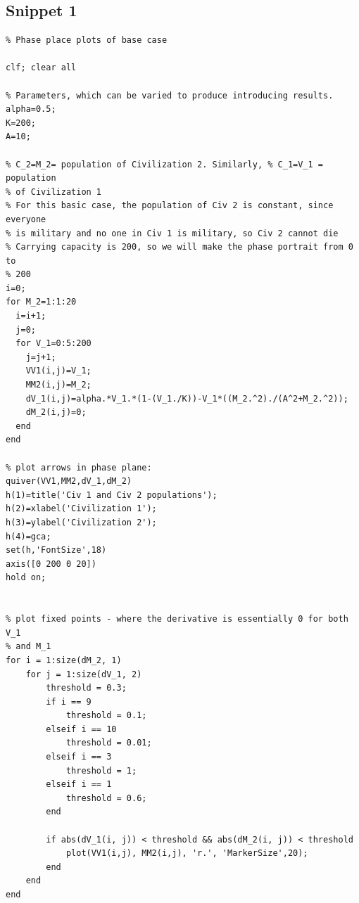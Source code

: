\documentclass[12pt]{article}
\begin{document}
\subsection{Snippet 1}
\begin{verbatim}
% Phase place plots of base case

clf; clear all

% Parameters, which can be varied to produce introducing results. 
alpha=0.5;
K=200; 
A=10;

% C_2=M_2= population of Civilization 2. Similarly, % C_1=V_1 = population
% of Civilization 1
% For this basic case, the population of Civ 2 is constant, since everyone
% is military and no one in Civ 1 is military, so Civ 2 cannot die
% Carrying capacity is 200, so we will make the phase portrait from 0 to
% 200
i=0;
for M_2=1:1:20
  i=i+1;
  j=0;
  for V_1=0:5:200
    j=j+1;
    VV1(i,j)=V_1;
    MM2(i,j)=M_2;
    dV_1(i,j)=alpha.*V_1.*(1-(V_1./K))-V_1*((M_2.^2)./(A^2+M_2.^2));
    dM_2(i,j)=0;
  end
end

% plot arrows in phase plane:
quiver(VV1,MM2,dV_1,dM_2)
h(1)=title('Civ 1 and Civ 2 populations');
h(2)=xlabel('Civilization 1');
h(3)=ylabel('Civilization 2');
h(4)=gca;
set(h,'FontSize',18)
axis([0 200 0 20])
hold on;


% plot fixed points - where the derivative is essentially 0 for both V_1
% and M_1
for i = 1:size(dM_2, 1)
    for j = 1:size(dV_1, 2)
        threshold = 0.3;
        if i == 9
            threshold = 0.1;
        elseif i == 10
            threshold = 0.01;
        elseif i == 3
            threshold = 1;
        elseif i == 1
            threshold = 0.6;
        end
        
        if abs(dV_1(i, j)) < threshold && abs(dM_2(i, j)) < threshold
            plot(VV1(i,j), MM2(i,j), 'r.', 'MarkerSize',20);
        end
    end
end
\end{verbatim}
\end{document}
